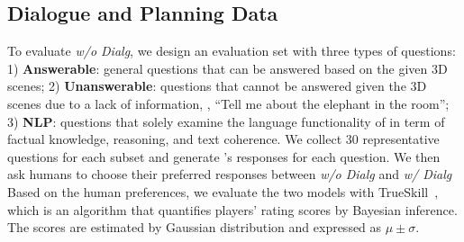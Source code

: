 \begin{table}[t!]
    \centering
    \setlength\tabcolsep{3pt}
    \label{tab:llm_ablation}
\end{table}

\subsection{Dialogue and Planning Data}\label{sec:dialog_planning}
To evaluate \textit{w/o Dialg}, we design an evaluation set with three types of questions: 1) \textbf{Answerable}: general questions that can be answered based on the given 3D scenes; 2) \textbf{Unanswerable}: questions that cannot be answered given the 3D scenes due to a lack of information, \eg, ``Tell me about the elephant in the room''; 3) \textbf{NLP}: questions that solely examine the language functionality of \agent in term of factual knowledge, reasoning, and text coherence. We collect 30 representative questions for each subset and generate \agent's responses for each question. We then ask humans to choose their preferred responses between \textit{w/o Dialg} and \textit{w/ Dialg} Based on the human preferences, we evaluate the two models with TrueSkill~\cite{graepel2007bayesian}, which is an algorithm that quantifies players’ rating scores by Bayesian inference. The scores are estimated by Gaussian distribution and expressed as $\mu\pm\sigma$.


